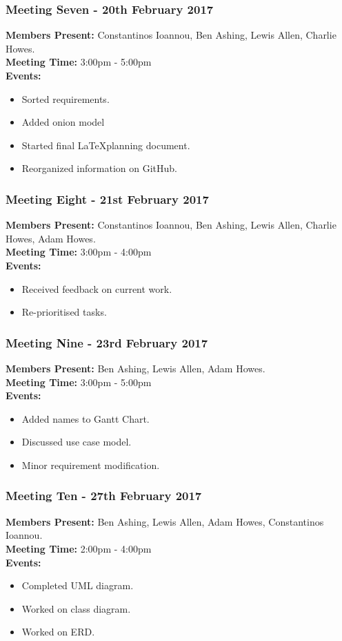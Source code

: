 \documentclass[a4paper]{article}
\begin{document}
\subsubsection*{Meeting Seven - 20th February 2017}
\textbf{Members Present:} Constantinos Ioannou, Ben Ashing, Lewis Allen, Charlie Howes. \\
\textbf{Meeting Time:} 3:00pm - 5:00pm \\
\textbf{Events:} 
\begin{itemize}
    \item Sorted requirements.
    \item Added onion model
    \item Started final \LaTeX planning document.
    \item Reorganized information on GitHub.
\end{itemize}

\subsubsection*{Meeting Eight - 21st February 2017}
\textbf{Members Present:} Constantinos Ioannou, Ben Ashing, Lewis Allen, Charlie Howes, Adam Howes. \\
\textbf{Meeting Time:} 3:00pm - 4:00pm \\
\textbf{Events:} 
\begin{itemize}
    \item Received feedback on current work.
    \item Re-prioritised tasks.
\end{itemize}

\subsubsection*{Meeting Nine - 23rd February 2017}
\textbf{Members Present:} Ben Ashing, Lewis Allen, Adam Howes. \\
\textbf{Meeting Time:} 3:00pm - 5:00pm \\
\textbf{Events:} 
\begin{itemize}
    \item Added names to Gantt Chart.
    \item Discussed use case model.
    \item Minor requirement modification.
\end{itemize}

\subsubsection*{Meeting Ten - 27th February 2017}
\textbf{Members Present:} Ben Ashing, Lewis Allen, Adam Howes, Constantinos Ioannou. \\
\textbf{Meeting Time:} 2:00pm - 4:00pm \\
\textbf{Events:} 
\begin{itemize}
    \item Completed UML diagram.
    \item Worked on class diagram.
    \item Worked on ERD.
\end{itemize}
\end{document}
